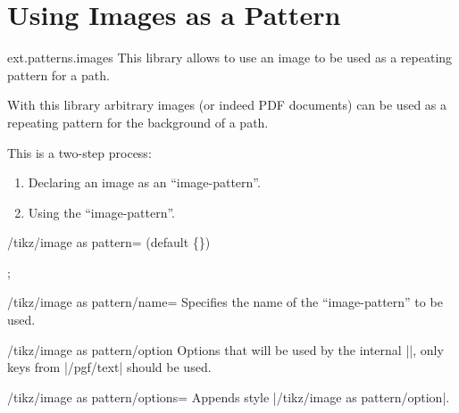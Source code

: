 %
%
%
\clearpage
\section{Using Images as a Pattern}
\label{library:patterns.images}

\begin{tikzlibrary}{ext.patterns.images}
  This library allows to use an image to be used as a repeating pattern for a path.
  
\end{tikzlibrary}

With this library arbitrary images (or indeed PDF documents) can be used as
a repeating pattern for the background of a path.

This is a two-step process:
\begin{enumerate}
\item Declaring an image as an ``image-pattern''.
\item Using the ``image-pattern''.
\end{enumerate}

\begin{command}{\pgfsetupimageaspattern{}}
\end{command}

\begin{key}{/tikz/image as pattern= (default \{\})}

\begin{codeexample}[preamble=\usetikzlibrary{ext.patterns.images,shapes.geometric}]
\tikz \node[star, minimum size=3cm, draw,
  image as pattern={name=grid,options={left, bottom, y=-.5cm, rotate=45}}] {};
\end{codeexample}
\end{key}

\begin{key}{/tikz/image as pattern/name=}
Specifies the name of the ``image-pattern'' to be used.
\end{key}

\begin{stylekey}{/tikz/image as pattern/option}
Options that will be used by the internal |\pgftext|,\indexCommandO{\pgftext}
only keys from |/pgf/text| should be used.
\end{stylekey}

\begin{stylekey}{/tikz/image as pattern/options=}
Appends style |/tikz/image as pattern/option|.
\end{stylekey}